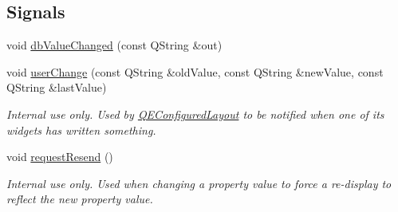 \subsection*{Signals}
\begin{DoxyCompactItemize}
\item 
void \hyperlink{classQELineEdit_afcb8e7fbd0ff9a04c9319ce6e7ef17d5}{dbValueChanged} (const QString \&out)
\item 
\hypertarget{classQELineEdit_ac2afeaed99dafc730e69cb72c453405e}{
void \hyperlink{classQELineEdit_ac2afeaed99dafc730e69cb72c453405e}{userChange} (const QString \&oldValue, const QString \&newValue, const QString \&lastValue)}
\label{classQELineEdit_ac2afeaed99dafc730e69cb72c453405e}

\begin{DoxyCompactList}\small\item\em Internal use only. Used by \hyperlink{classQEConfiguredLayout}{QEConfiguredLayout} to be notified when one of its widgets has written something. \end{DoxyCompactList}\item 
\hypertarget{classQELineEdit_a8a4ec73be0e79bd465308aeeac44fab3}{
void \hyperlink{classQELineEdit_a8a4ec73be0e79bd465308aeeac44fab3}{requestResend} ()}
\label{classQELineEdit_a8a4ec73be0e79bd465308aeeac44fab3}

\begin{DoxyCompactList}\small\item\em Internal use only. Used when changing a property value to force a re-\/display to reflect the new property value. \end{DoxyCompactList}\end{DoxyCompactItemize}
